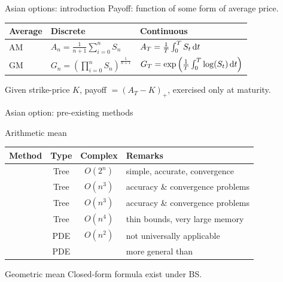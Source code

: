 \documentclass[utf8,t,xcolor=svgnames]{beamer}
\begin{document}
\begin{frame}{Asian options: introduction}
	Payoff: function of some form of average price.
	
	\bigskip
	
	\begin{tabular}{lll}
		\toprule
		Average  &  Discrete  &  Continuous  \\
		\midrule
		AM  &  $ A_n = \frac{1}{n+1} \sum_{i=0}^{n} S_n $  &  $ A_T = \frac{1}{T} \int_{0}^{T} S_t \dif t $  \\
		GM  &  $ G_n = \left( \prod_{i=0}^{n} S_n \right)^{\frac{1}{n+1}} $  &  $  
		G_T = \exp \left(  \frac{1}{T} \int_{0}^{T} \log(S_t) \dif t  \right) $  \\
		\bottomrule
	\end{tabular}
	
	\bigskip
	
	\begin{example}
		Given strike-price $ K $, payoff $ = (A_T - K)_+ $, exercised only at maturity.
	\end{example}	
\end{frame}


\begin{frame}{Asian option: pre-existing methods}
	\begin{block}{Arithmetic mean}
		\begin{tabular}{cccl}
			\toprule
			Method  &  Type  &  Complex  &  Remarks  \\
			\midrule
			\cite{Cox1979}  &  Tree  &  \alert{$ O(2^n) $}  &  simple, accurate, convergence  \\
			\cite{Hull1993}  &  Tree  &  $ O(n^3) $  &  accuracy \& convergence problems  \\
			\cite{Barraquand1996}  &  Tree  &  $ O(n^3) $  &  accuracy \& convergence problems  \\
			\cite{Chalasani1999}  &  Tree  &  $ O(n^4) $  &  thin bounds, very large memory  \\
			\cite{Vecer2001}  &  PDE  &  $ O(n^2) $  &  not universally applicable  \\
			\cite{dHalluin2005}  &  PDE  &    &  more general than \cite{Vecer2001} \\
			\bottomrule
		\end{tabular}
	\end{block}
	
	\bigskip
	
	\begin{block}{Geometric mean}
		Closed-form formula exist under BS.
	\end{block}
\end{frame}
\end{document}
